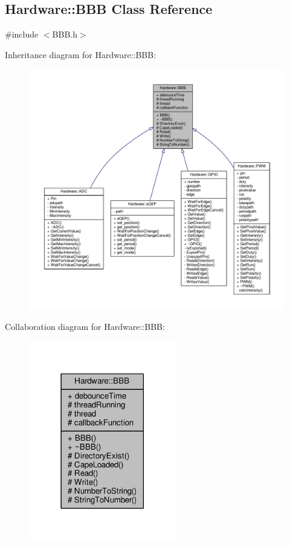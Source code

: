 \hypertarget{class_hardware_1_1_b_b_b}{}\subsection{Hardware\+:\+:B\+B\+B Class Reference}
\label{class_hardware_1_1_b_b_b}


{\ttfamily \#include $<$B\+B\+B.\+h$>$}



Inheritance diagram for Hardware\+:\+:B\+B\+B\+:
\nopagebreak
\begin{figure}[H]
\begin{center}
\leavevmode
\includegraphics[width=350pt]{class_hardware_1_1_b_b_b__inherit__graph}
\end{center}
\end{figure}


Collaboration diagram for Hardware\+:\+:B\+B\+B\+:
\nopagebreak
\begin{figure}[H]
\begin{center}
\leavevmode
\includegraphics[width=182pt]{class_hardware_1_1_b_b_b__coll__graph}
\end{center}
\end{figure}
